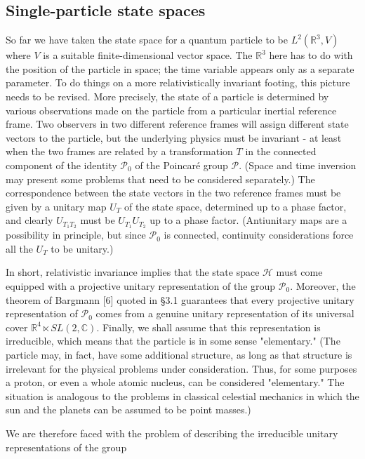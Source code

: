 \documentclass[10pt, letterpaper]{article}
\begin{document}
\subsection*{Single-particle state spaces}
So far we have taken the state space for a quantum particle to be $L^{2}\left(\mathbb{R}^{3}, V\right)$ where $V$ is a suitable finite-dimensional vector space. The $\mathbb{R}^{3}$ here has to do with the position of the particle in space; the time variable appears only as a separate parameter. To do things on a more relativistically invariant footing, this picture needs to be revised. More precisely, the state of a particle is determined by various observations made on the particle from a particular inertial reference frame. Two observers in two different reference frames will assign different state vectors to the particle, but the underlying physics must be invariant - at least when the two frames are related by a transformation $T$ in the connected component of the identity $\mathcal{P}_{0}$ of the Poincaré group $\mathcal{P}$. (Space and time inversion may present some problems that need to be considered separately.) The correspondence between the state vectors in the two reference frames must be given by a unitary map $U_{T}$ of the state space, determined up to a phase factor, and clearly $U_{T_{1} T_{2}}$ must be $U_{T_{1}} U_{T_{2}}$ up to a phase factor. (Antiunitary maps are a possibility in principle, but since $\mathcal{P}_{0}$ is connected, continuity considerations force all the $U_{T}$ to be unitary.)

In short, relativistic invariance implies that the state space $\mathcal{H}$ must come equipped with a projective unitary representation of the group $\mathcal{P}_{0}$. Moreover, the theorem of Bargmann [6] quoted in §3.1 guarantees that every projective unitary representation of $\mathcal{P}_{0}$ comes from a genuine unitary representation of its universal cover $\mathbb{R}^{4} \ltimes S L(2, \mathbb{C})$. Finally, we shall assume that this representation is irreducible, which means that the particle is in some sense "elementary." (The particle may, in fact, have some additional structure, as long as that structure is irrelevant for the physical problems under consideration. Thus, for some purposes a proton, or even a whole atomic nucleus, can be considered "elementary." The situation is analogous to the problems in classical celestial mechanics in which the sun and the planets can be assumed to be point masses.)

We are therefore faced with the problem of describing the irreducible unitary representations of the group
\end{document}
